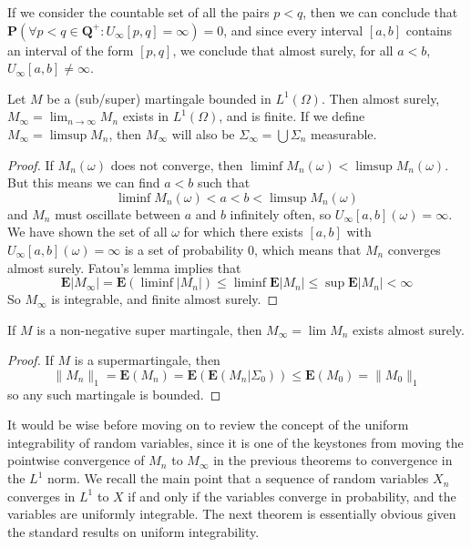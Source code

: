 If we consider the countable set of all the pairs $p < q$, then we can conclude that $\mathbf{P}(\forall p < q \in \mathbf{Q}^+: U_\infty[p,q] = \infty) = 0$, and since every interval $[a,b]$ contains an interval of the form $[p,q]$, we conclude that almost surely, for all $a < b$, $U_\infty[a,b] \neq \infty$.

\begin{theorem}
    Let $M$ be a (sub/super) martingale bounded in $L^1(\Omega)$. Then almost surely, $M_\infty = \lim_{n \to \infty} M_n$ exists in $L^1(\Omega)$, and is finite. If we define $M_\infty = \limsup M_n$, then $M_\infty$ will also be $\Sigma_\infty = \bigcup \Sigma_n$ measurable.
\end{theorem}
\begin{proof}
    If $M_n(\omega)$ does not converge, then $\liminf M_n(\omega) < \limsup M_n(\omega)$. But this means we can find $a < b$ such that
    \[ \liminf M_n(\omega) < a < b < \limsup M_n(\omega) \]
    and $M_n$ must oscillate between $a$ and $b$ infinitely often, so $U_\infty[a,b](\omega) = \infty$. We have shown the set of all $\omega$ for which there exists $[a,b]$ with $U_\infty[a,b](\omega) = \infty$ is a set of probability 0, which means that $M_n$ converges almost surely. Fatou's lemma implies that
    \[ \mathbf{E}|M_\infty| = \mathbf{E}(\liminf |M_n|) \leq \liminf \mathbf{E} |M_n| \leq \sup \mathbf{E}|M_n| < \infty \]
    So $M_\infty$ is integrable, and finite almost surely.
\end{proof}

\begin{corollary}
    If $M$ is a non-negative super martingale, then $M_\infty = \lim M_n$ exists almost surely.
\end{corollary}
\begin{proof}
    If $M$ is a supermartingale, then
    \[ \|M_n\|_1 = \mathbf{E}(M_n) = \mathbf{E}(\mathbf{E}(M_n|\Sigma_0)) \leq \mathbf{E}(M_0) = \|M_0\|_1 \]
    so any such martingale is bounded.
\end{proof}

It would be wise before moving on to review the concept of the uniform integrability of random variables, since it is one of the keystones from moving the pointwise convergence of $M_n$ to $M_\infty$ in the previous theorems to convergence in the $L^1$ norm. We recall the main point that a sequence of random variables $X_n$ converges in $L^1$ to $X$ if and only if the variables converge in probability, and the variables are uniformly integrable. The next theorem is essentially obvious given the standard results on uniform integrability.

